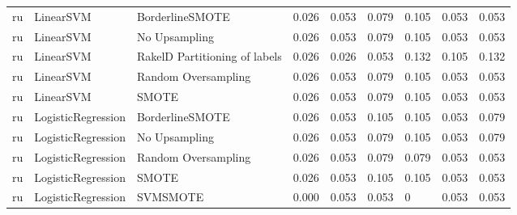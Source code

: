 \begin{tabular}{lllllllll}
      ru &                       LinearSVM &               BorderlineSMOTE &     0.026 &                     0.053 &                 0.079 &                  0.105 &                                   0.053 &     0.053 \\
      ru &                       LinearSVM &                 No Upsampling &     0.026 &                     0.053 &                 0.079 &                  0.105 &                                   0.053 &     0.053 \\
      ru &                       LinearSVM & RakelD Partitioning of labels &     0.026 &                     0.026 &                 0.053 &                  0.132 &                                   0.105 &     0.132 \\
      ru &                       LinearSVM &           Random Oversampling &     0.026 &                     0.053 &                 0.079 &                  0.105 &                                   0.053 &     0.053 \\
      ru &                       LinearSVM &                         SMOTE &     0.026 &                     0.053 &                 0.079 &                  0.105 &                                   0.053 &     0.053 \\
      ru &              LogisticRegression &               BorderlineSMOTE &     0.026 &                     0.053 &                 0.105 &                  0.105 &                                   0.053 &     0.079 \\
      ru &              LogisticRegression &                 No Upsampling &     0.026 &                     0.053 &                 0.079 &                  0.105 &                                   0.053 &     0.079 \\
      ru &              LogisticRegression &           Random Oversampling &     0.026 &                     0.053 &                 0.079 &                  0.079 &                                   0.053 &     0.053 \\
      ru &              LogisticRegression &                         SMOTE &     0.026 &                     0.053 &                 0.105 &                  0.105 &                                   0.053 &     0.053 \\
      ru &              LogisticRegression &                      SVMSMOTE &     0.000 &                     0.053 &                 0.053 &                      0 &                                   0.053 &     0.053 \\

\end{tabular}
